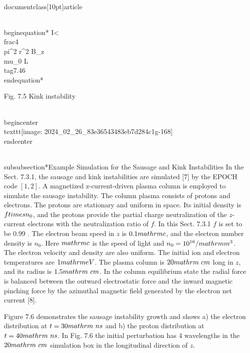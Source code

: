 \\documentclass[10pt]{article}
\begin{document}
{{{{\\begin{equation*}
I<\\frac{4 \\pi^{2} r^{2} B_{z}}{\\mu_{0} L} \\tag{7.46}
\\end{equation*}


Fig. 7.5 Kink instability

\\begin{center}
\\texttt{[image: 2024\_02\_26\_83e36543483eb7d284c1g-168]}
\\end{center}

\\subsubsection*{Example Simulation for the Sausage and Kink Instabilities}
In the Sect. 7.3.1, the sausage and kink instabilities are simulated [7] by the EPOCH code $[1,2]$. A magnetized z-current-driven plasma column is employed to simulate the sausage instability. The column plasma consists of protons and electrons. The protons are stationary and uniform in space. Its initial density is $f \\times n_{0}$, and the protons provide the partial charge neutralization of the $z$-current electrons with the neutralization ratio of $f$. In this Sect. 7.3.1 $f$ is set to be 0.99 . The electron beam speed in $z$ is $0.1 \\mathrm{c}$, and the electron number density is $n_{0}$. Here $\\mathrm{c}$ is the speed of light and $n_{0}=10^{16} / \\mathrm{m}^{3}$. The electron velocity and density are also uniform. The initial ion and electron temperatures are $1 \\mathrm{eV}$. The plasma column is $20 \\mathrm{~cm}$ long in $z$, and its radius is $1.5 \\mathrm{~cm}$. In the column equilibrium state the radial force is balanced between the outward electrostatic force and the inward magnetic pinching force by the azimuthal magnetic field generated by the electron net current [8].

Figure 7.6 demonstrates the sausage instability growth and shows a) the electron distribution at $t=30 \\mathrm{~ns}$ and b) the proton distribution at $t=40 \\mathrm{~ns}$. In Fig. 7.6 the initial perturbation has 4 wavelengths in the $20 \\mathrm{~cm}$ simulation box in the longitudinal direction of $z$.

}}}}
\end{document}
